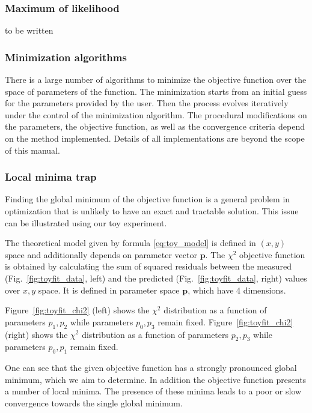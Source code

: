 \subsubsection*{Maximum of likelihood}
to be written


\subsubsection*{Minimization algorithms}
There is a large number of algorithms to minimize the objective function over the space of parameters of the function.
The minimization starts from an initial guess for the parameters
provided by the user. Then the process evolves iteratively under the
control of the minimization algorithm. The procedural
modifications on the parameters, the objective function, as well as
the convergence
criteria depend on the method implemented.
Details of all implementations are beyond the scope of this manual.



\subsubsection*{Local minima trap}
Finding the global minimum of the objective function 
is a general problem in optimization that is unlikely to have an exact and 
tractable solution. This issue can be illustrated using our toy experiment.

The theoretical model given by formula \ref{eq:toy_model} is defined
in $(x,y)$ space and additionally depends on parameter vector $\mathbf{p}$. 
The $\chi^2$ 
objective function is obtained by calculating the sum of squared residuals between
the measured (Fig.~\ref{fig:toyfit_data}, left) and the 
predicted (Fig.~\ref{fig:toyfit_data}, right) values over $x,y$ space. It is defined
in parameter space $\mathbf{p}$, which have 4 dimensions.

Figure~\ref{fig:toyfit_chi2} (left) shows the $\chi^2$ distribution as a function of
parameters $p_1,p_2$  while parameters $p_0,p_3$ remain fixed.
Figure~\ref{fig:toyfit_chi2} (right) shows the $\chi^2$ distribution as a function of
parameters $p_2,p_3$ while parameters $p_0,p_1$ remain fixed.

One can see that the given objective function has a strongly
pronounced global minimum, which we aim to determine. In addition the
objective function presents a number of local minima.
The presence of these minima leads to a poor or slow convergence
towards the  single global minimum.


